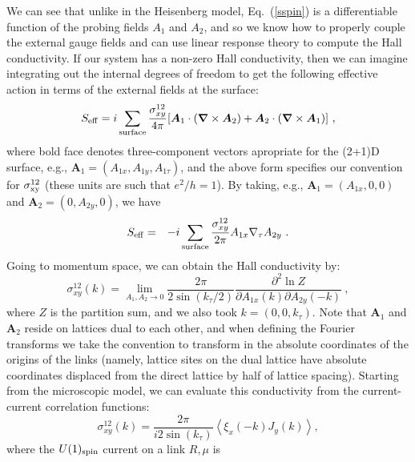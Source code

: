 \documentclass[prb,twocolumn]{revtex4-1}
\begin{document}
 We can see that unlike in the Heisenberg model, Eq.~(\ref{sspin}) is a differentiable function of the probing fields $A_1$ and $A_2$, and so we know how to properly couple the external gauge fields and can use linear response theory to compute the Hall conductivity. If our system has a non-zero Hall conductivity, then we can imagine integrating out the internal degrees of freedom to get the following effective action in terms of the external fields at the surface:
\begin{equation}
S_{\rm eff} = i \sum_{\rm surface} 
\frac{\sigma_{xy}^{12}}{4\pi} [{\bm A}_1 \cdot ({\bm \nabla} \times {\bm A}_2) + {\bm A}_2 \cdot ({\bm \nabla} \times {\bm A}_1)] ~,
\label{Seff}
\end{equation}
where bold face denotes three-component vectors apropriate for the (2+1)D surface, e.g., ${\bm A}_1 = (A_{1x}, A_{1y}, A_{1\tau})$, and the above form specifies our convention for $\sigma^{12}_{\rm xy}$ (these units are such that $e^2/h=1$).  By taking, e.g., ${\bm A}_1 = (A_{1x}, 0, 0)$ and ${\bm A}_2 = (0, A_{2y}, 0)$, we have
\begin{eqnarray}
S_{\rm eff} &=& -i \sum_{\rm surface} \frac{\sigma_{xy}^{12}}{2\pi} A_{1x} \nabla_\tau A_{2y} ~.
\end{eqnarray}
Going to momentum space, we can obtain the Hall conductivity by:
\begin{equation}
\sigma_{xy}^{12}(k) = \lim_{A_1,A_2 \to 0} \frac{2\pi}{2 \sin(k_\tau/2)}\frac{\partial^2 \ln Z}{\partial A_{1x}(k) \partial A_{2y}(-k)} ~,
\end{equation}
where $Z$ is the partition sum, and we also took $k = (0, 0, k_\tau)$.  Note that ${\bm A}_1$ and ${\bm A}_2$ reside on lattices dual to each other, and when defining the Fourier transforms we take the convention to transform in the absolute coordinates of the origins of the links (namely, lattice sites on the dual lattice have absolute coordinates displaced from the direct lattice by half of lattice spacing). 
Starting from the microscopic model, we can evaluate this conductivity from the current-current correlation functions:
\begin{equation}
\sigma_{xy}^{12}(k)=\frac{2\pi}{i 2\sin(k_\tau)} \left\langle\xi_x(-k) J_y(k) \right\rangle,
\end{equation}
where the $U(1)_{\rm spin}$ current on a link $R,\mu$ is
\end{document}
